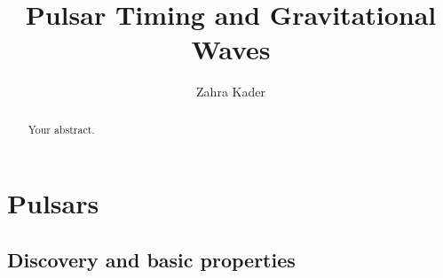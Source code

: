 \documentclass[12pt]{article}
\title{Pulsar Timing and Gravitational Waves}
\author{Zahra Kader}
\begin{document}
	\maketitle

\begin{abstract}
	Your abstract.
\end{abstract}		
	
	\section{Pulsars}
	\label{sec:Pulsars}
	
	\subsection{Discovery and basic properties}
	
\end{document}
